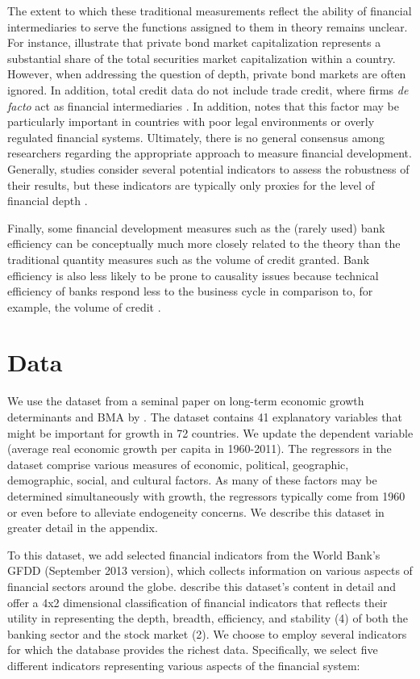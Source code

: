 The extent to which these traditional measurements reflect the ability of financial intermediaries to serve the functions assigned to them in theory remains unclear. For instance, \citet{Cihaketal2013} illustrate that private bond market capitalization represents a substantial share of the total securities market capitalization within a country. However, when addressing the question of depth, private bond markets are often ignored. In addition, total credit data do not include trade credit, where firms \textit{de facto} act as financial intermediaries \citep{PetersenRajan1997}. In addition, \citet{Levine2005} notes that this factor may be particularly important in countries with poor legal environments or overly regulated financial systems. Ultimately, there is no general consensus among researchers regarding the appropriate approach to measure financial development. Generally, studies consider several potential indicators to assess the robustness of their results, but these indicators are typically only proxies for the level of financial depth \citep{Valickovaetal2014}.

Finally, some financial development measures such as the (rarely used) bank efficiency can be conceptually much more closely related to the theory \citep{Pagano1993} than the traditional quantity measures such as the volume of credit granted. Bank efficiency is also less likely to be prone to causality issues because technical efficiency of banks respond less to the business cycle in comparison to, for example, the volume of credit \citep{KoetterWedow2010}.

\section{Data}
\label{ch2sec:data}
We use the dataset from a seminal paper on long-term economic growth determinants and \ac{BMA} by \citet{Fernandezetal2001}. The dataset contains 41 explanatory variables that might be important for growth in 72 countries. We update the dependent variable (average real economic growth per capita in 1960-2011). The regressors in the dataset comprise various measures of economic, political, geographic, demographic, social, and cultural factors. As many of these factors may be determined simultaneously with growth, the regressors typically come from 1960 or even before to alleviate endogeneity concerns. We describe this dataset in greater detail in the appendix.

To this dataset, we add selected financial indicators from the World Bank's \ac{GFDD} (September 2013 version), which collects information on various aspects of financial sectors around the globe. \citet{Cihaketal2013} describe this dataset's content in detail and offer a 4x2 dimensional classification of financial indicators that reflects their utility in representing the depth, breadth, efficiency, and stability (4) of both the banking sector and the stock market (2). We choose to employ several indicators for which the database provides the richest data. Specifically, we select five different indicators representing various aspects of the financial system:

